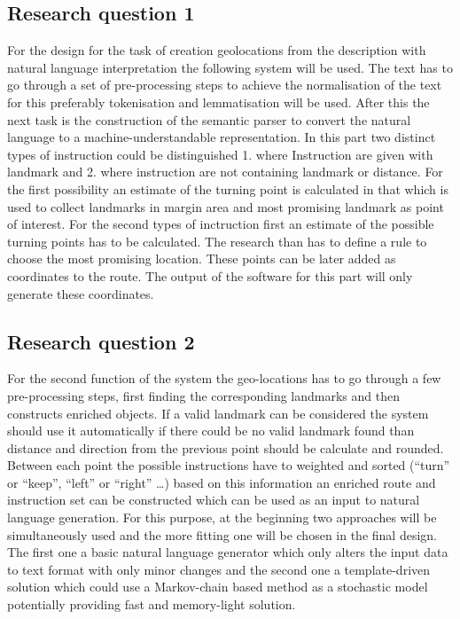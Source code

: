 \subsection{Research question 1}
For the design for the task of creation geolocations from the description with natural language interpretation the following system will be used. The text has to go through a set of pre-processing steps to achieve the normalisation of the text for this preferably tokenisation and lemmatisation will be used. After this the next task is the construction of the semantic parser to convert the natural language to a machine-understandable representation. In this part two distinct types of instruction could be distinguished 1. where Instruction are given with landmark and 2. where instruction are not containing landmark or distance. For the first possibility an estimate of the turning point is calculated in that which is used to collect landmarks in margin area and most promising landmark as point of interest.  For the second types of inctruction first an estimate of the possible turning points has to be calculated. The research than has to define a rule to choose the most promising location. These points can be later added as coordinates to the route. The output of the software for this part will only generate these coordinates. 

\subsection{Research question 2}
For the second function of the system the geo-locations has to go through a few pre-processing steps, first finding the corresponding landmarks and then constructs enriched objects. If a valid landmark can be considered the system should use it automatically if there could be no valid landmark found than distance and direction from the previous point should be calculate and rounded. Between each point the possible instructions have to weighted and sorted (“turn” or “keep”, “left” or “right” …) based on this information an enriched route and instruction set can be constructed which can be used as an input to natural language generation. For this purpose, at the beginning two approaches will be simultaneously used and the more fitting one will be chosen in the final design. The first one a basic natural language generator which only alters the input data to text format with only minor changes and the second one a template-driven solution which could use a Markov-chain based method as a stochastic model potentially providing fast and memory-light solution.
